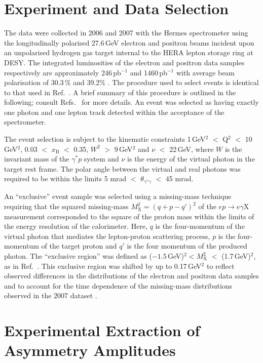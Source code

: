 \section{Experiment and Data Selection}
The data were collected in 2006 and 2007 with the H{\sc ermes}
spectrometer \cite{Ack98} using the longitudinally polarised 27.6\,GeV
electron and positron beams incident upon an unpolarised hydrogen gas
target internal to the HERA lepton storage ring at DESY. The integrated
luminosities of the electron and positron data samples respectively are
approximately 246\,pb$^{-1}$ and 1460\,pb$^{-1}$\blue{,} with average beam polarisation of 30.3\,\% and 39.2\% \cite{Ben01}. The procedure used to select events is identical to that used in Ref.~\cite{Air09}.
A brief summary of this procedure is outlined in the following; consult
Refs.~\cite{Zei09,Bur10} for more details. An event
was selected as having exactly one photon and one lepton
track detected within the acceptance of the spectrometer.

The event selection is subject to the kinematic constraints 1\,GeV$^{2}$ $<$
Q$^{2}$ $<$ 10\,GeV$^{2}$, 0.03 $<$ $x_{\textrm{B}}$ $<$ 0.35, $W^{2}$ $>$
9\,GeV$^{2}$ and $\nu$ $<$ 22\,GeV, where $W$ is the invariant mass of the
$\gamma^{*}p$ system and $\nu$ is the energy of the virtual photon in the target
rest frame. The polar angle between the virtual and real photons was required to
be within the limits 5 mrad $<$
$\theta_{\gamma^{*}\gamma}$ $<$ 45 mrad. 

An ``exclusive'' event sample was selected using a missing-mass technique requiring that the squared missing-mass $M_{\textrm{X}}^{2}=(q+p-q')^{2}$ of the $ep \rightarrow e\gamma \textrm{X}$ measurement corresponded to the square of the proton mass within the limits of the energy resolution of the calorimeter. Here, $q$ is the four-momentum of the virtual photon that mediates the lepton-proton scattering process, $p$ is the four-momentum of the target proton and $q'$ is the four momentum of the produced photon. The ``exclusive region'' was defined as ($-1.5$\,GeV)$^{2} < M_{\textrm{X}}^{2}$ $<$ (1.7\,GeV)$^{2}$, as in Ref.~\cite{Air09}. This exclusive region was shifted by up to 0.17\,GeV$^{2}$ to reflect observed differences in the distributions of the electron and positron data samples and to account for the time dependence of the missing-mass distributions observed in the 2007 dataset \cite{Bur10}. 

\section{Experimental Extraction of Asymmetry Amplitudes}

